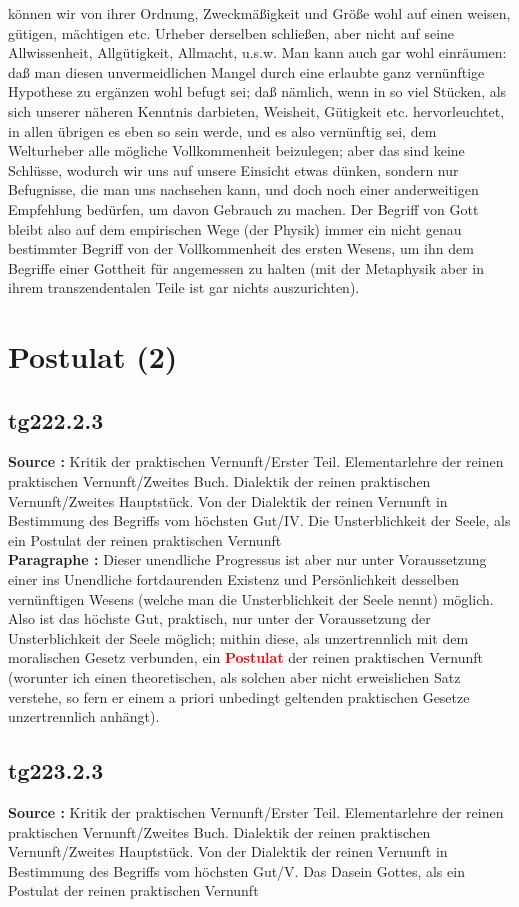 \documentclass[a4paper,12pt,twoside]{book}
\newcommand{\match}[1]{\textcolor{red}{\textbf{#1}}}
\newcommand{\unnumberedsection}[1]{
	\section*{#1}
	\addcontentsline{toc}{section}{#1}
	\markright{#1}
}
\begin{document}
können wir von ihrer Ordnung, Zweckmäßigkeit und Größe wohl auf einen weisen, gütigen, mächtigen etc. Urheber derselben schließen, aber nicht auf seine Allwissenheit, Allgütigkeit, Allmacht, u.s.w. Man kann auch gar wohl einräumen: daß man diesen unvermeidlichen Mangel durch eine erlaubte ganz vernünftige Hypothese zu ergänzen wohl befugt sei; daß nämlich, wenn in so viel Stücken, als sich unserer näheren Kenntnis darbieten, Weisheit, Gütigkeit etc. hervorleuchtet, in allen übrigen es eben so sein werde, und es also vernünftig sei, dem Welturheber alle mögliche Vollkommenheit beizulegen; aber das sind keine Schlüsse, wodurch wir uns auf unsere Einsicht etwas dünken, sondern nur Befugnisse, die man uns nachsehen kann, und doch noch einer anderweitigen Empfehlung bedürfen, um davon Gebrauch zu machen. Der Begriff von Gott bleibt also auf dem empirischen Wege (der Physik) immer ein nicht genau bestimmter Begriff von der Vollkommenheit des ersten Wesens, um ihn dem Begriffe einer Gottheit für angemessen zu halten (mit der Metaphysik aber in ihrem transzendentalen Teile ist gar nichts auszurichten). 
	
	\unnumberedsection{Postulat (2)} 
	\subsection*{tg222.2.3} 
	\textbf{Source : }Kritik der praktischen Vernunft/Erster Teil. Elementarlehre der reinen praktischen Vernunft/Zweites Buch. Dialektik der reinen praktischen Vernunft/Zweites Hauptstück. Von der Dialektik der reinen Vernunft in Bestimmung des Begriffs vom höchsten Gut/IV. Die Unsterblichkeit der Seele, als ein Postulat der reinen praktischen Vernunft\\  
	
	\textbf{Paragraphe : }Dieser unendliche Progressus ist aber nur unter Voraussetzung einer ins Unendliche fortdaurenden Existenz und Persönlichkeit desselben vernünftigen Wesens (welche man die Unsterblichkeit der Seele nennt) möglich. Also ist das höchste Gut, praktisch, nur unter der Voraussetzung der Unsterblichkeit der Seele möglich; mithin diese, als unzertrennlich mit dem moralischen Gesetz verbunden, ein \match{Postulat} der reinen praktischen Vernunft (worunter ich  einen theoretischen, als solchen aber nicht erweislichen Satz verstehe, so fern er einem a priori unbedingt geltenden praktischen Gesetze unzertrennlich anhängt). 
	
	\subsection*{tg223.2.3} 
	\textbf{Source : }Kritik der praktischen Vernunft/Erster Teil. Elementarlehre der reinen praktischen Vernunft/Zweites Buch. Dialektik der reinen praktischen Vernunft/Zweites Hauptstück. Von der Dialektik der reinen Vernunft in Bestimmung des Begriffs vom höchsten Gut/V. Das Dasein Gottes, als ein Postulat der reinen praktischen Vernunft\\  
	
\end{document}

